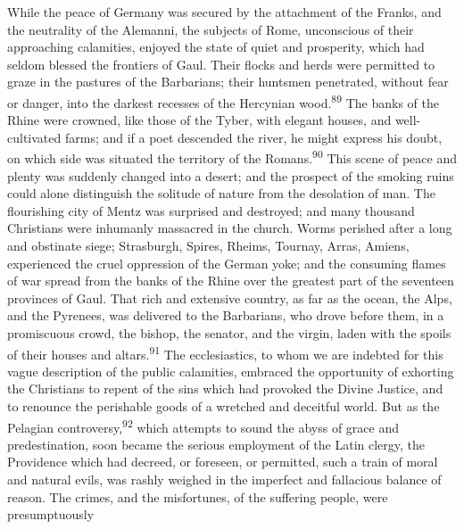 
While the peace of Germany was secured by the attachment of the
Franks, and the neutrality of the Alemanni, the subjects of Rome,
unconscious of their approaching calamities, enjoyed the state of
quiet and prosperity, which had seldom blessed the frontiers of
Gaul. Their flocks and herds were permitted to graze in the
pastures of the Barbarians; their huntsmen penetrated, without
fear or danger, into the darkest recesses of the Hercynian wood.\textsuperscript{89}
The banks of the Rhine were crowned, like those of the Tyber,
with elegant houses, and well-cultivated farms; and if a poet
descended the river, he might express his doubt, on which side
was situated the territory of the Romans.\textsuperscript{90} This scene of peace
and plenty was suddenly changed into a desert; and the prospect
of the smoking ruins could alone distinguish the solitude of
nature from the desolation of man. The flourishing city of Mentz
was surprised and destroyed; and many thousand Christians were
inhumanly massacred in the church. Worms perished after a long
and obstinate siege; Strasburgh, Spires, Rheims, Tournay, Arras,
Amiens, experienced the cruel oppression of the German yoke; and
the consuming flames of war spread from the banks of the Rhine
over the greatest part of the seventeen provinces of Gaul. That
rich and extensive country, as far as the ocean, the Alps, and
the Pyrenees, was delivered to the Barbarians, who drove before
them, in a promiscuous crowd, the bishop, the senator, and the
virgin, laden with the spoils of their houses and altars.\textsuperscript{91} The
ecclesiastics, to whom we are indebted for this vague description
of the public calamities, embraced the opportunity of exhorting
the Christians to repent of the sins which had provoked the
Divine Justice, and to renounce the perishable goods of a
wretched and deceitful world. But as the Pelagian controversy,\textsuperscript{92}
which attempts to sound the abyss of grace and predestination,
soon became the serious employment of the Latin clergy, the
Providence which had decreed, or foreseen, or permitted, such a
train of moral and natural evils, was rashly weighed in the
imperfect and fallacious balance of reason. The crimes, and the
misfortunes, of the suffering people, were presumptuously
